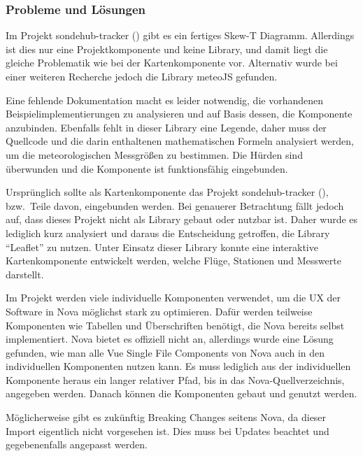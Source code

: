 \newpage

\subsubsection{Probleme und Lösungen}

Im Projekt sondehub-tracker (\cite{sondehub-tracker}) gibt es ein fertiges Skew-T Diagramm.
Allerdings ist dies nur eine Projektkomponente und keine Library, und damit liegt die gleiche Problematik wie bei der Kartenkomponente vor.
Alternativ wurde bei einer weiteren Recherche jedoch die Library meteoJS gefunden.

Eine fehlende Dokumentation macht es leider notwendig, die vorhandenen Beispielimplementierungen zu analysieren und auf Basis dessen, die Komponente anzubinden.
Ebenfalls fehlt in dieser Library eine Legende, daher muss der Quellcode und die darin enthaltenen mathematischen Formeln analysiert werden, um die meteorologischen Messgrößen zu bestimmen.
Die Hürden sind überwunden und die Komponente ist funktionsfähig eingebunden.

Ursprünglich sollte als Kartenkomponente das Projekt sondehub-tracker (\cite{sondehub-tracker}), bzw.\ Teile davon, eingebunden werden.
Bei genauerer Betrachtung fällt jedoch auf, dass dieses Projekt nicht als Library gebaut oder nutzbar ist.
Daher wurde es lediglich kurz analysiert und daraus die Entscheidung getroffen, die Library \enquote{Leaflet} zu nutzen.
Unter Einsatz dieser Library konnte eine interaktive Kartenkomponente entwickelt werden, welche Flüge, Stationen und Messwerte darstellt.

Im Projekt werden viele individuelle Komponenten verwendet, um die UX der Software in Nova möglichst stark zu optimieren.
Dafür werden teilweise Komponenten wie Tabellen und Überschriften benötigt, die Nova bereits selbst implementiert.
Nova bietet es offiziell nicht an, allerdings wurde eine Lösung gefunden, wie man alle Vue Single File Components von Nova auch in den individuellen Komponenten nutzen kann.
Es muss lediglich aus der individuellen Komponente heraus ein langer relativer Pfad, bis in das Nova-Quellverzeichnis, angegeben werden.
Danach können die Komponenten gebaut und genutzt werden.

Möglicherweise gibt es zukünftig Breaking Changes seitens Nova, da dieser Import eigentlich nicht vorgesehen ist.
Dies muss bei Updates beachtet und gegebenenfalls angepasst werden.

